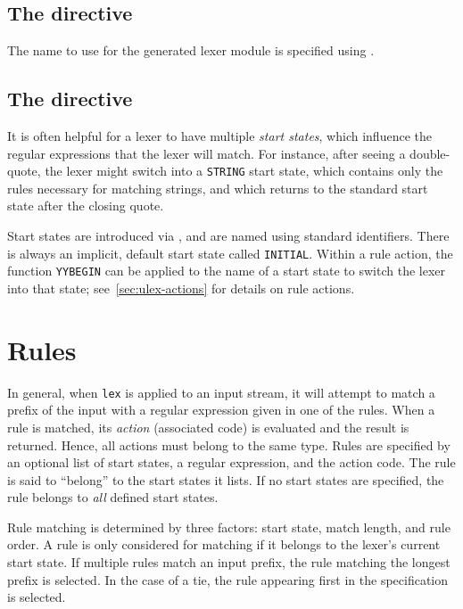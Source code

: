 \subsection{The  directive}

The name to use for the generated lexer module is specified using .

\subsection{The  directive}

It is often helpful for a lexer to have multiple \emph{start states}, which influence the regular expressions that the lexer will match.  For instance, after seeing a double-quote, the lexer might switch into a \texttt{STRING} start state, which contains only the rules necessary for matching strings, and which returns to the standard start state after the closing quote.

Start states are introduced via , and are named using standard identifiers.  There is always an implicit, default start state called \texttt{INITIAL}.  Within a rule action, the function \texttt{YYBEGIN} can be applied to the name of a start state to switch the lexer into that state; see~\ref{sec:ulex-actions} for details on rule actions.

\section{Rules}\label{sec:ulex-rules}

In general, when \texttt{lex} is applied to an input stream, it will attempt to match a prefix of the input with a regular expression given in one of the rules.  When a rule is matched, its \emph{action} (associated code) is evaluated and the result is returned.  Hence, all actions must belong to the same type.%
Rules are specified by an optional list of start states, a regular expression, and the action code.  The rule is said to ``belong'' to the start states it lists.  If no start states are specified, the rule belongs to \emph{all} defined start states.

Rule matching is determined by three factors: start state, match length, and rule order.  A rule is only considered for matching if it belongs to the lexer's current start state.  If multiple rules match an input prefix, the rule matching the longest prefix is selected.  In the case of a tie, the rule appearing first in the specification is selected.

